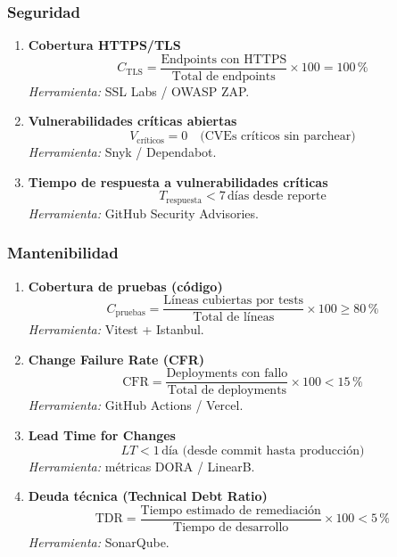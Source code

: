 \documentclass[12pt, a4paper]{article}
\begin{document}
\subsubsection*{Seguridad}

\begin{enumerate}[leftmargin=*, label=\textbf{KPI \arabic*.}, start=18]

    \item \textbf{Cobertura HTTPS/TLS}
    \[
        C_{\text{TLS}} = \frac{\text{Endpoints con HTTPS}}{\text{Total de endpoints}} \times 100 = 100\,\%
    \]
    \textit{Herramienta:} SSL Labs / OWASP ZAP.

    \item \textbf{Vulnerabilidades críticas abiertas}
    \[
        V_{\text{críticos}} = 0 \quad \text{(CVEs críticos sin parchear)}
    \]
    \textit{Herramienta:} Snyk / Dependabot.

    \item \textbf{Tiempo de respuesta a vulnerabilidades críticas}
    \[
        T_{\text{respuesta}} < 7\,\text{días desde reporte}
    \]
    \textit{Herramienta:} GitHub Security Advisories.

\end{enumerate}

\subsubsection*{Mantenibilidad}

\begin{enumerate}[leftmargin=*, label=\textbf{KPI \arabic*.}, start=21]

    \item \textbf{Cobertura de pruebas (código)}
    \[
        C_{\text{pruebas}} = \frac{\text{Líneas cubiertas por tests}}{\text{Total de líneas}} \times 100 \geq 80\,\%
    \]
    \textit{Herramienta:} Vitest + Istanbul.

    \item \textbf{Change Failure Rate (CFR)}
    \[
        \text{CFR} = \frac{\text{Deployments con fallo}}{\text{Total de deployments}} \times 100 < 15\,\%
    \]
    \textit{Herramienta:} GitHub Actions / Vercel.

    \item \textbf{Lead Time for Changes}
    \[
        LT < 1\,\text{día (desde commit hasta producción)}
    \]
    \textit{Herramienta:} métricas DORA / LinearB.

    \item \textbf{Deuda técnica (Technical Debt Ratio)}
    \[
        \text{TDR} = \frac{\text{Tiempo estimado de remediación}}{\text{Tiempo de desarrollo}} \times 100 < 5\,\%
    \]
    \textit{Herramienta:} SonarQube.

\end{enumerate}
\end{document}
